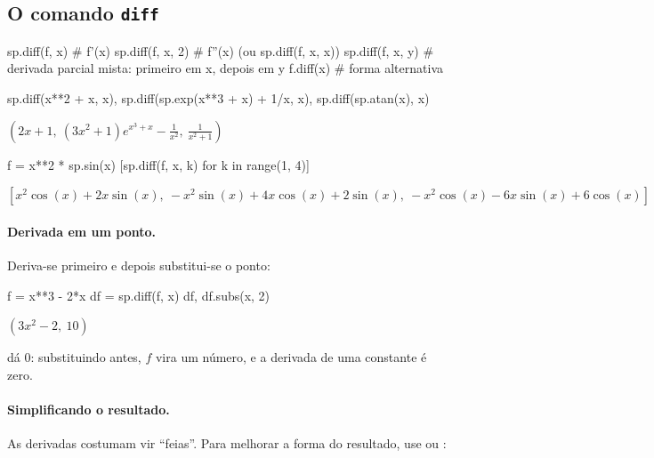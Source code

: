 \subsection{O comando \texttt{diff}}

\begin{sintaxe}
sp.diff(f, x)          # f'(x)
sp.diff(f, x, 2)       # f''(x)   (ou sp.diff(f, x, x))
sp.diff(f, x, y)       # derivada parcial mista: primeiro em x, depois em y
f.diff(x)              # forma alternativa
\end{sintaxe}

\begin{entrada}
sp.diff(x**2 + x, x), sp.diff(sp.exp(x**3 + x) + 1/x, x), sp.diff(sp.atan(x), x)
\end{entrada}
\begin{saidamat}
$\displaystyle \left( 2 x + 1, \  \left(3 x^{2} + 1\right) e^{x^{3} + x} - \frac{1}{x^{2}}, \  \frac{1}{x^{2} + 1}\right)$
\end{saidamat}

\begin{entrada}
f = x**2 * sp.sin(x)
[sp.diff(f, x, k) for k in range(1, 4)]
\end{entrada}
\begin{saidamat}
$\displaystyle \left[ x^{2} \cos{\left(x \right)} + 2 x \sin{\left(x \right)}, \  - x^{2} \sin{\left(x \right)} + 4 x \cos{\left(x \right)} + 2 \sin{\left(x \right)}, \  - x^{2} \cos{\left(x \right)} - 6 x \sin{\left(x \right)} + 6 \cos{\left(x \right)}\right]$
\end{saidamat}

\paragraph{Derivada em um ponto.} Deriva-se primeiro e depois substitui-se o ponto:

\begin{entrada}
f = x**3 - 2*x
df = sp.diff(f, x)
df, df.subs(x, 2)
\end{entrada}
\begin{saidamat}
$\displaystyle \left( 3 x^{2} - 2, \  10\right)$
\end{saidamat}

\begin{atencao}
 dá 0: substituindo antes, $f$ vira um número, e a derivada de uma constante é zero.
\end{atencao}

\paragraph{Simplificando o resultado.} As derivadas costumam vir ``feias''. Para melhorar a
forma do resultado, use  ou :

